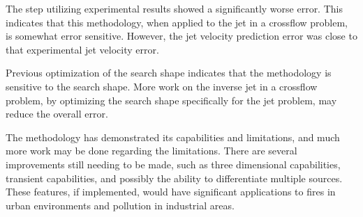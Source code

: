 \documentclass[preprint,12pt]{elsarticle}
\begin{document}
The step utilizing experimental results showed a significantly worse error.  This indicates that this methodology, when applied to the jet in a crossflow problem, is somewhat error sensitive.  However, the jet velocity prediction error was close to that experimental jet velocity error.

Previous optimization of the search shape indicates that the methodology is sensitive to the search shape\cite{ijhmt2}.  More work on the inverse jet in a crossflow problem, by optimizing the search shape specifically for the jet problem, may reduce the overall error.

The methodology has demonstrated its capabilities and limitations, and much more work may be done regarding the limitations.  There are several improvements still needing to be made, such as three dimensional capabilities, transient capabilities, and possibly the ability to differentiate multiple sources.  These features, if implemented, would have significant applications to fires in urban environments and pollution in industrial areas.
\appendix

{}

\end{document}
